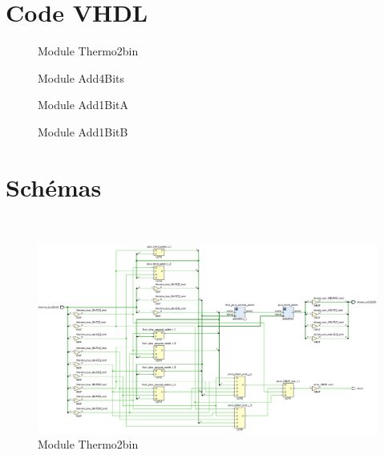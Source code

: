 \newpage
\appendix
\section{Code VHDL}

\begin{figure}[H]
  \tiny
\centering
\begin{varwidth}{\linewidth}
  
\end{varwidth}
\caption{Module Thermo2bin}
\end{figure}

\begin{figure}[H]
  \tiny
\centering
\begin{varwidth}{\linewidth}
  
\end{varwidth}
\caption{Module Add4Bits}
\end{figure}

\begin{figure}[H]
  \tiny
\centering
\begin{varwidth}{\linewidth}
  
\end{varwidth}
\caption{Module Add1BitA}
\end{figure}

\begin{figure}[H]
  \tiny
\centering
\begin{varwidth}{\linewidth}
  
\end{varwidth}
\caption{Module Add1BitB}
\end{figure}

\section{Schémas}

\\


\begin{figure}[H]
\centering
  \includegraphics[width=.7\textwidth]{assets/img/schematic-thermo2bin.png}
\caption{Module Thermo2bin}
\end{figure}

